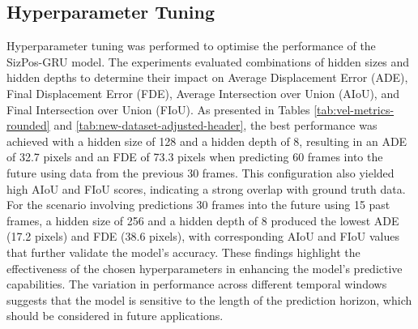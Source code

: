 \documentclass[12pt,oneside]{book} %
\begin{document}
\subsection{Hyperparameter Tuning}

Hyperparameter tuning was performed to optimise the performance of the
SizPos-GRU model. The experiments evaluated combinations of hidden sizes and
hidden depths to determine their impact on Average Displacement Error (ADE),
Final Displacement Error (FDE), Average Intersection over Union (AIoU), and
Final Intersection over Union (FIoU). As presented in Tables
\ref{tab:vel-metrics-rounded} and \ref{tab:new-dataset-adjusted-header}, the
best performance was achieved with a hidden size of 128 and a hidden depth of
8, resulting in an ADE of 32.7 pixels and an FDE of 73.3 pixels when predicting
60 frames into the future using data from the previous 30 frames. This
configuration also yielded high AIoU and FIoU scores, indicating a strong
overlap with ground truth data. For the scenario involving predictions 30
frames into the future using 15 past frames, a hidden size of 256 and a hidden
depth of 8 produced the lowest ADE (17.2 pixels) and FDE (38.6 pixels), with
corresponding AIoU and FIoU values that further validate the model’s accuracy.
These findings highlight the effectiveness of the chosen hyperparameters in
enhancing the model’s predictive capabilities. The variation in performance
across different temporal windows suggests that the model is sensitive to the
length of the prediction horizon, which should be considered in future
applications.
\end{document}
